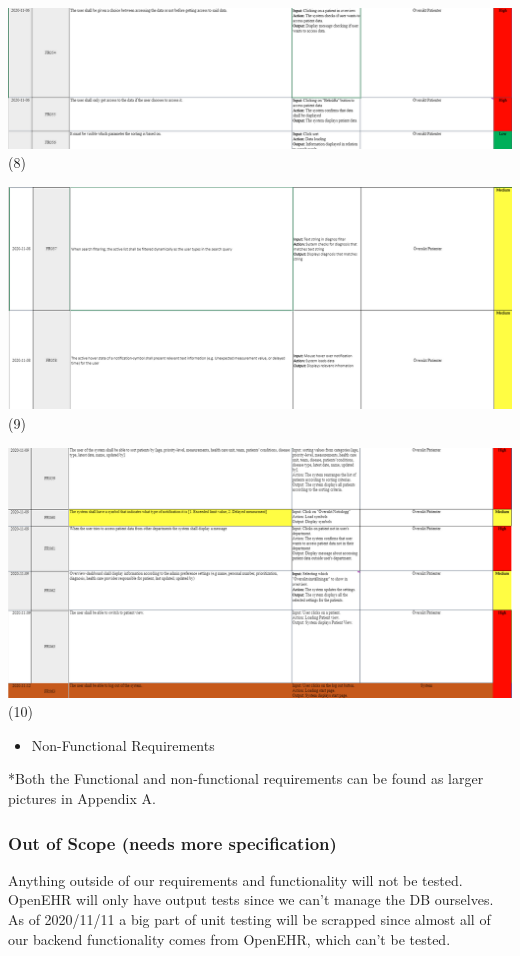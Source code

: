     \vfill
\includegraphics[width=\linewidth]{Pictures/Func8} (8)

    \vfill
\includegraphics[width=\linewidth]{Pictures/Func9} (9)

    \vfill
\includegraphics[width=\linewidth]{Pictures/Func10} (10)

    \vfill
\clearpage
\begin{itemize}
    \item Non-Functional Requirements 
\end{itemize}

    \vfill
*Both the Functional and non-functional requirements can be found as larger pictures in Appendix A.
  
  


\subsubsection{Out of Scope (needs more specification)}
Anything outside of our requirements and functionality will not be tested. OpenEHR will only have output tests since we can't manage the DB ourselves. As of 2020/11/11 a big part of unit testing will be scrapped since almost all of our backend functionality comes from OpenEHR, which can't be tested. 
